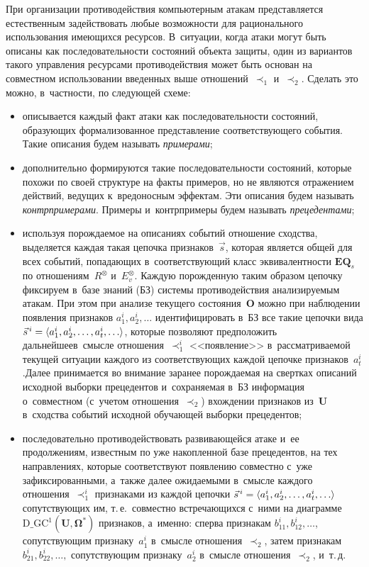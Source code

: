 \begin{multicols}{2}
  При организации противодействия компьютерным атакам представляется 
естественным задействовать любые возможности для рационального 
использования имеющихся ресурсов. В~ситуации, когда атаки могут быть 
описаны как последовательности состояний объекта защиты, один из вариантов 
такого управления ресурсами противодействия может быть основан на 
совместном использовании введенных выше отношений~$\prec_1$ и~$\prec_2$. 
Сделать это можно, в~частности, по следующей схеме:
  \begin{itemize}
\item описывается каждый факт атаки как последовательности состояний, 
образующих формализованное представление соответствующего события. 
Такие описания будем называть \textit{примерами};
\item дополнительно формируются такие последовательности состояний, 
которые похожи по своей структуре на факты примеров, но не являются 
отражением действий, ведущих к~вредоносным эффектам. Эти описания 
будем называть \textit{контрпримерами}. Примеры и~контрпримеры будем 
называть \textit{прецедентами};
\item используя порождаемое на описаниях событий отношение сходства, 
выделяется каждая такая цепочка признаков~$\vec{s}$, которая является 
общей для всех событий, попадающих в~соответствующий класс 
эквивалентности $\mathbf{EQ}_s$ по отношениям~$R^\otimes$ 
и~$E_v^\otimes$. Каждую порожденную таким образом цепочку фиксируем 
в~базе знаний (БЗ) системы противодействия анализируемым атакам. При 
этом при анализе текущего состояния~$\mathbf{O}$ можно при наблюдении 
появления признаков $a_1^i, a_2^i, \ldots$ идентифицировать в~БЗ все такие 
цепочки вида $\vec{s}^{\,i}\hm= \langle a_1^i, a_2^i, \ldots , a_t^i,\ldots \rangle$, 
которые позволяют предположить дальнейшее\linebreak в~смысле 
отношения~$\prec_1^i$ <<появление>> в~рас\-смат\-ри\-ва\-емой текущей ситуации 
каждого из соответствующих каждой цепочке признаков~$a^i_t$.\linebreak Далее 
принимается во внимание заранее по\-рож\-да\-емая на свертках описаний 
исходной выборки прецедентов и~сохраняемая в~БЗ информация 
о~совместном (с~учетом отношения~$\prec_2$) вхождении признаков 
из~$\mathbf{U}$ в~сходства событий исходной обучающей выборки 
прецедентов; 
\item последовательно противодействовать развивающейся атаке и~ее 
продолжениям, известным по уже накопленной базе прецедентов, на тех 
направлениях, которые соответствуют появлению совместно с~уже 
зафиксированными, а~также далее ожидаемыми в~смысле каждого 
отношения~$\prec_1^i$ признаками из каждой цепочки $\vec{s}^{\,i}\hm= \langle 
a_1^i, a_2^i, \ldots , a_t^i,\ldots \rangle$ сопутствующих им, т.\,е.\ совместно 
встречающихся с~ними на диаграмме 
$\mathrm{D}\_\mathrm{GC}^1(\mathbf{U},{\boldsymbol{\Omega}}^*)$ признаков, а~именно: 
сперва признакам $b_{11}^i, b_{12}^i, \ldots$, сопутствующим 
признаку~$a_1^i$ в~смысле отношения~$\prec_2$, затем признакам $b_{21}^i, 
b_{22}^i,\ldots ,$ сопутствующим признаку~$a_2^i$ в~смыс\-ле 
отношения~$\prec_2$, и~т.\,д. 
\end{itemize}
  

\end{multicols}

